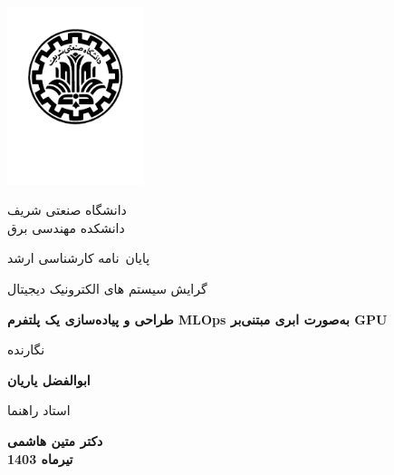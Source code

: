 

\thispagestyle{empty}
{\centering
	\mainjeldfont
	\vspace*{-2.5cm}
	\begin{latin}
		\centering
		\includegraphics[width=4cm]{Sharif_Logo.pdf}
	\end{latin}
	
	\vspace*{-2cm}
	
	{\Large دانشگاه صنعتی شریف \\ \vspace{0mm} \large دانشکده مهندسی برق}
	
	\vspace{1.4cm}
	
	{\large پایان~نامه کارشناسی ارشد\par} 
	{\large  گرایش سیستم های الکترونیک دیجیتال\par}  
	\vspace{1.3cm}
	{\Huge \textbf{طراحی و پیاده‌سازی یک پلتفرم MLOps به‌صورت ابری مبتنی‌بر GPU} }\par
	
	\vfil
	{\fieldnamefont نگارنده} \par
	{\Large\textbf{ابوالفضل یاریان}}
	
	\vfil
	{\fieldnamefont استاد راهنما} \par 
	{\Large\textbf{دکتر متین هاشمی}}\\
	
	
	
	\vfil
	{\textbf{تیرماه 1403}}
	
	
	
}